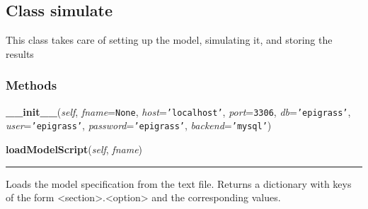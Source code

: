 \subsection{Class simulate}

    \label{Epigrass:manager:simulate}
This class takes care of setting up the model, simulating it, and storing 
the results



  \subsubsection{Methods}

    \label{Epigrass:manager:simulate:__init__}

    \vspace{0.5ex}

    \begin{boxedminipage}{\textwidth}

    \raggedright \textbf{\_\_init\_\_}(\textit{self}, \textit{fname}=\texttt{None}, \textit{host}=\texttt{'localhost'}, \textit{port}=\texttt{3306}, \textit{db}=\texttt{'epigrass'}, \textit{user}=\texttt{'epigrass'}, \textit{password}=\texttt{'epigrass'}, \textit{backend}=\texttt{'mysql'})

    \end{boxedminipage}

    \label{Epigrass:manager:simulate:loadModelScript}

    \vspace{0.5ex}

    \begin{boxedminipage}{\textwidth}

    \raggedright \textbf{loadModelScript}(\textit{self}, \textit{fname})

    \vspace{-1.5ex}

    \rule{\textwidth}{0.5\fboxrule}
    Loads the model specification from the text file. Returns a dictionary 
    with keys of the form 
    {\textless}section{\textgreater}.{\textless}option{\textgreater} and 
    the corresponding values.

    \vspace{1ex}

    \end{boxedminipage}

